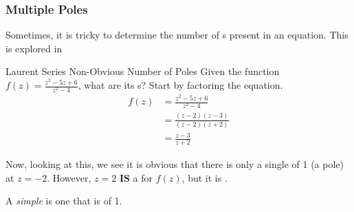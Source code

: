 \subsubsection{Multiple Poles}\label{subsubsec:Multiple_Poles}
Sometimes, it is tricky to determine the number of s present in an equation.
This is explored in 
\begin{example}{Laurent Series Non-Obvious Number of Poles}
  Given the function $f(z) = \frac{z^{2} - 5z + 6}{z^{2} - 4}$, what are its s?
  \tcblower{}
  Start by factoring the equation.
  \begin{align*}
    f(z) &= \frac{z^{2} - 5z + 6}{z^{2}- 4} \\
         &= \frac{(z-2) (z-3)}{(z-2) (z+2)} \\
         &= \frac{z-3}{z+2}
  \end{align*}

  Now, looking at this, we see it is obvious that there is only a single  of  1 (a  pole) at $z=-2$.
  However, $z=2$ \textbf{IS} a  for $f(z)$, but it is .
\end{example}

\begin{definition}[Simple]\label{def:Simple_Pole}
  A \emph{simple}  is one that is of  1.
\end{definition}

